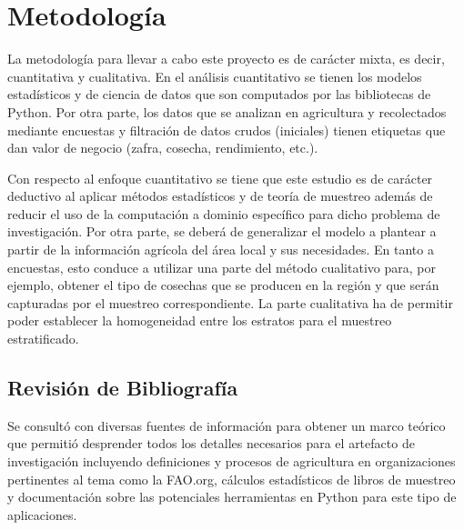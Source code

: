 \documentclass[conference]{IEEEtran}
\begin{document}




\section{Metodología}

La metodología para llevar a cabo este proyecto es de carácter mixta, es decir, cuantitativa y cualitativa. En el análisis cuantitativo se tienen los modelos estadísticos y de ciencia de datos que son computados por las bibliotecas de Python. Por otra parte, los datos que se analizan en agricultura y recolectados mediante encuestas y filtración de datos crudos (iniciales) tienen etiquetas que dan valor de negocio (zafra, cosecha, rendimiento, etc.).

\bigbreak

Con respecto al enfoque cuantitativo se tiene que este estudio es de carácter deductivo al aplicar métodos estadísticos y de teoría de muestreo además de reducir el uso de la computación a dominio específico para dicho problema de investigación. Por otra parte, se deberá de generalizar el modelo a plantear a partir de la información agrícola del área local y sus necesidades. En tanto a encuestas, esto conduce a utilizar una parte del método cualitativo para, por ejemplo, obtener el tipo de cosechas que se producen en la región y que serán capturadas por el muestreo correspondiente. La parte cualitativa ha de permitir poder establecer la homogeneidad entre los estratos para el muestreo estratificado.

\subsection{Revisión de Bibliografía}

Se consultó con diversas fuentes de información para obtener un marco teórico que permitió desprender todos los detalles necesarios para el artefacto de investigación incluyendo definiciones y procesos de agricultura en organizaciones pertinentes al tema como la FAO.org, cálculos estadísticos de libros de muestreo y documentación sobre las potenciales herramientas en Python para este tipo de aplicaciones.




\end{document}

